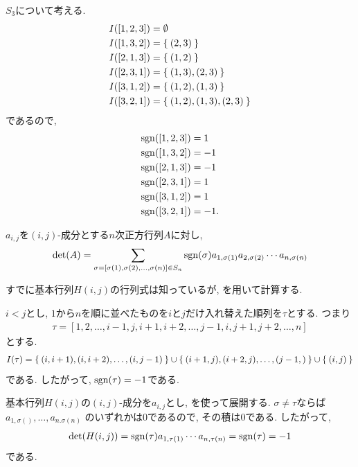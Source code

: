 \begin{example}
  $S_3$について考える.
  \begin{align*}
    I([1,2,3])&=\emptyset\\
    I([1,3,2])&=\Set{(2,3)}\\
    I([2,1,3])&=\Set{(1,2)}\\
    I([2,3,1])&=\Set{(1,3),(2,3)}\\
    I([3,1,2])&=\Set{(1,2),(1,3)}\\
    I([3,2,1])&=\Set{(1,2),(1,3),(2,3)}
  \end{align*}
  であるので,
  \begin{align*}
    \operatorname{sgn}([1,2,3])&=1\\
    \operatorname{sgn}([1,3,2])&=-1\\
    \operatorname{sgn}([2,1,3])&=-1\\
    \operatorname{sgn}([2,3,1])&=1\\
    \operatorname{sgn}([3,1,2])&=1\\
    \operatorname{sgn}([3,2,1])&=-1.
  \end{align*}
\end{example}

\begin{theorem}
  \label{thm:det:closedformula}
  $a_{i,j}$を$(i,j)$-成分とする$n$次正方行列$A$に対し,
  \begin{align*}
    \det(A)=\sum_{\sigma=[\sigma(1),\sigma(2),\ldots,\sigma(n)]\in S_n}
    \operatorname{sgn}(\sigma)
    a_{1,\sigma(1)}a_{2,\sigma(2)}\cdots a_{n,\sigma(n)}
  \end{align*}
\end{theorem}

すでに基本行列$H(i,j)$の行列式は知っているが,
を用いて計算する.
\begin{example}
  $i<j$とし,
  $1$から$n$を順に並べたものを$i$と$j$だけ入れ替えた順列を$\tau$とする.
  つまり
  \begin{align*}
    \tau=[1,2,\ldots,i-1,j,i+1,i+2,\ldots,j-1,i,j+1,j+2,\ldots,n]
  \end{align*}
  とする.
  \begin{align*}
    I(\tau)=\Set{(i,i+1),(i,i+2),\ldots,(i,j-1)}\cup\Set{(i+1,j),(i+2,j),\ldots,(j-1,)}\cup\Set{(i,j)}
  \end{align*}
  である.  したがって, $\operatorname{sgn}(\tau)=-1$である.
  
  基本行列$H(i,j)$の$(i,j)$-成分を$a_{i,j}$とし,
  を使って展開する.
  $\sigma\neq \tau$ならば
  $a_{1,\sigma()},\ldots,a_{n.\sigma(n)}$
  のいずれかは$0$であるので, その積は$0$である.
  したがって,
  \begin{align*}
    \det(H(i,j))=\operatorname{sgn}(\tau)a_{1,\tau(1)}\cdots a_{n,\tau(n)}=\operatorname{sgn}(\tau)=-1
  \end{align*}
  である.
\end{example}

